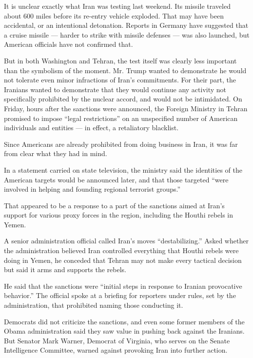 It is unclear exactly what Iran was testing last weekend. Its missile
traveled about 600 miles before its re-entry vehicle exploded. That may
have been accidental, or an intentional detonation. Reports in Germany
have suggested that a cruise missile --- harder to strike with missile
defenses --- was also launched, but American officials have not
confirmed that.

But in both Washington and Tehran, the test itself was clearly less
important than the symbolism of the moment. Mr. Trump wanted to
demonstrate he would not tolerate even minor infractions of Iran's
commitments. For their part, the Iranians wanted to demonstrate that
they would continue any activity not specifically prohibited by the
nuclear accord, and would not be intimidated. On Friday, hours after the
sanctions were announced, the Foreign Ministry in Tehran promised to
impose ``legal restrictions'' on an unspecified number of American
individuals and entities --- in effect, a retaliatory blacklist.

Since Americans are already prohibited from doing business in Iran, it
was far from clear what they had in mind.

In a statement carried on state television, the ministry said the
identities of the American targets would be announced later, and that
those targeted ``were involved in helping and founding regional
terrorist groups.''

That appeared to be a response to a part of the sanctions aimed at
Iran's support for various proxy forces in the region, including the
Houthi rebels in Yemen.

A senior administration official called Iran's moves ``destabilizing.''
Asked whether the administration believed Iran controlled everything
that Houthi rebels were doing in Yemen, he conceded that Tehran may not
make every tactical decision but said it arms and supports the rebels.

He said that the sanctions were ``initial steps in response to Iranian
provocative behavior.'' The official spoke at a briefing for reporters
under rules, set by the administration, that prohibited naming those
conducting it.

Democrats did not criticize the sanctions, and even some former members
of the Obama administration said they saw value in pushing back against
the Iranians. But Senator Mark Warner, Democrat of Virginia, who serves
on the Senate Intelligence Committee, warned against provoking Iran into
further action.

